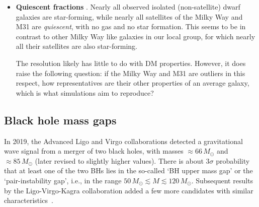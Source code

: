 \begin{itemize}
\item[$\blacktriangleright$]
{\bf Quiescent fractions} \cite{quiescentfraction}. Nearly all observed isolated (non-satellite) dwarf galaxies are star-forming, while nearly all satellites of the Milky Way and M31 are {\em quiescent}, with no gas and no star formation. This seems to be in contrast to other Milky Way like galaxies in our local group, for which nearly all their satellites are also star-forming. 

The resolution likely has little to do with DM properties. However, it does raise the following question: if the Milky Way and M31 are outliers in this respect, how representatives are their other properties of an average galaxy, which is what simulations aim to reproduce?

\end{itemize}







\subsection{Black hole mass gaps} 
\label{sec:BHmassgap}
In 2019, the {\sc Advanced Ligo} and {\sc Virgo} collaborations detected a gravitational wave signal from a merger of two black holes, with masses $\approx 66 \, M_\odot$ and $\approx 85 \, M_\odot$ (later revised to slightly higher values). There is about $3\sigma$ probability that at least one of the two BHs lies in the so-called `BH upper mass gap' or the `pair-instability gap', i.e., in the range $ 50 \, M_\odot \lesssim M\lesssim 120 \, M_\odot$. Subsequent results by the {\sc Ligo-Virgo-Kagra} collaboration added a few more candidates with similar characteristics~\cite{LIGO:massive:BH}. 


